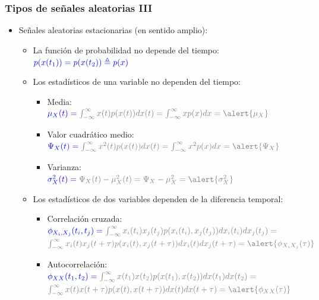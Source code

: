 \documentclass{beamer}
\numberwithin{section}{part}
\begin{document}

\begin{frame}
\frametitle{Tipos de señales aleatorias III}
  \vspace{-0.2cm}
  \footnotesize

  \begin{itemize}
    \item \alert{Señales aleatorias estacionarias (en sentido amplio): }
    \begin{itemize}
      \footnotesize
      \item La función de probabilidad no depende del tiempo: $\color{blue}p(x(t_1))=p(x(t_2))\triangleq p(x)$
      \vspace{0.1cm}
      \item Los estadísticos de una variable no dependen del tiempo:
      \begin{itemize}
        \scriptsize
        \item Media: \\$\color{blue}\mu_X(t)=\color{gray}\int_{-\infty}^\infty x(t)p(x(t))dx(t)=\int_{-\infty}^\infty xp(x)dx= \alert{\mu_X}$
        \item Valor cuadrático medio: \\$\color{blue}\Psi_X(t)=\color{gray}\int_{-\infty}^\infty x^2(t)p(x(t))dx(t)=\int_{-\infty}^\infty x^2p(x)dx=\alert{\Psi_X}$
        \item Varianza: \\$\color{blue}\sigma^2_X(t)=\color{gray}\Psi_X(t)-\mu^2_X(t)=\Psi_X-\mu^2_X=\alert{\sigma^2_X}$
      \end{itemize}
      \item Los estadísticos de dos variables dependen de la diferencia temporal:
      \begin{itemize}
        \scriptsize
        \item Correlación cruzada: $\color{blue}\phi_{X_i,X_j}(t_i,t_j) =\color{gray}\int_{-\infty}^\infty x_i(t_i)x_j(t_j)p(x_i(t_i),x_j(t_j))dx_i(t_i)dx_j(t_j)=$
        $\color{gray}\int_{-\infty}^\infty x_i(t)x_j(t+\tau)p(x_i(t),x_j(t+\tau))dx_i(t)dx_j(t+\tau)=\alert{\phi_{X_iX_j}(\tau)}$
        \item Autocorrelación:
        $\color{blue}\phi_{XX}(t_1,t_2)=\color{gray}\int_{-\infty}^\infty x(t_1)x(t_2)p(x(t_1),x(t_2))dx(t_1)dx(t_2)=$
        $\color{gray}\int_{-\infty}^\infty x(t)x(t+\tau)p(x(t),x(t+\tau))dx(t)dx(t+\tau)=\alert{\phi_{XX}(\tau)}$
      \end{itemize}
    \end{itemize}
  \end{itemize}
\end{frame}
\end{document}
